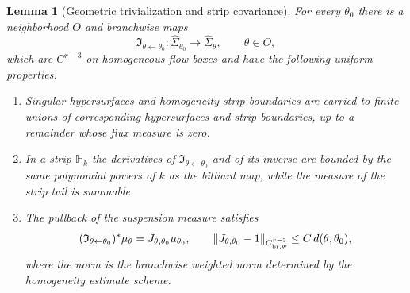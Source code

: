 \documentclass[12pt, letterpaper]{amsart}
\theoremstyle{plain}
\newtheorem{lemma}[theorem]{Lemma}
\theoremstyle{definition}
\theoremstyle{remark}
\begin{document}
\begin{lemma}[Geometric trivialization and strip covariance]
\label{lem:phase_bundle_trivialization}
For every $\theta_0$ there is a neighborhood $O$ and branchwise maps
\begin{equation}
    \mathfrak I_{\theta\leftarrow\theta_0}:
    \widehat\Sigma_{\theta_0}\longrightarrow\widehat\Sigma_\theta,
    \qquad \theta\in O,
\end{equation}
which are $C^{r-3}$ on homogeneous flow boxes and have the following uniform
properties.
\begin{enumerate}[label=(\alph*), wide, labelindent=0pt]
    \item Singular hypersurfaces and homogeneity-strip boundaries are carried
    to finite unions of corresponding hypersurfaces and strip boundaries, up to
    a remainder whose flux measure is zero.
    \item In a strip $\mathbb H_k$ the derivatives of
    $\mathfrak I_{\theta\leftarrow\theta_0}$ and of its inverse are bounded by
    the same polynomial powers of $k$ as the billiard map, while the measure of
    the strip tail is summable.
    \item The pullback of the suspension measure satisfies
    \begin{equation}
        (\mathfrak I_{\theta\leftarrow\theta_0})^*\mu_\theta
        =J_{\theta,\theta_0}\mu_{\theta_0},
        \qquad
        \|J_{\theta,\theta_0}-1\|_{C^{r-3}_{\rm br,w}}
        \le C\,d(\theta,\theta_0),
    \end{equation}
    where the norm is the branchwise weighted norm determined by the
    homogeneity estimate scheme.
\end{enumerate}
\end{lemma}
\end{document}
